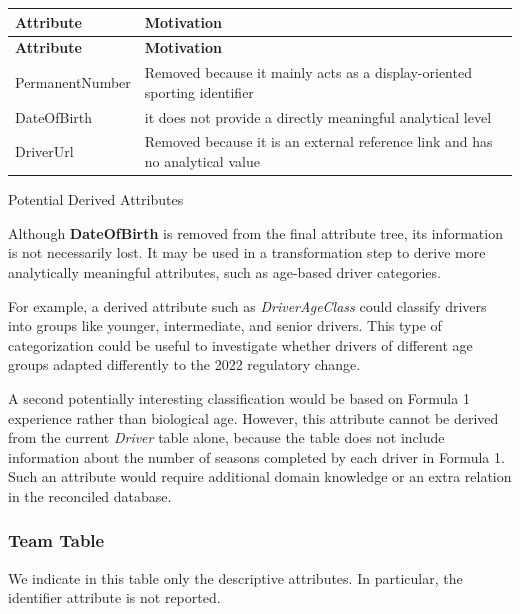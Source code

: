 \documentclass[a4paper,11pt]{article}
\begin{document}
	\begin{longtable}{|p{4.4cm}|p{10.8cm}|}
		\hline
		\textbf{Attribute} & \textbf{Motivation} \\
		\hline
		\endfirsthead
		
		\hline
		\textbf{Attribute} & \textbf{Motivation} \\
		\hline
		\endhead
		
		PermanentNumber & Removed because it mainly acts as a display-oriented sporting identifier  \\ \hline
		
		
		DateOfBirth & it does not provide a directly meaningful analytical level \\ \hline
		
		DriverUrl & Removed because it is an external reference link and has no analytical value \\ \hline
		
		
	\end{longtable}
	
	Potential Derived Attributes
	
	Although \textbf{DateOfBirth} is removed from the final attribute tree, its information is not necessarily lost. It may be used in a transformation step to derive more analytically meaningful attributes, such as age-based driver categories.
	
	For example, a derived attribute such as \textit{DriverAgeClass} could classify drivers into groups like younger, intermediate, and senior drivers. This type of categorization could be useful to investigate whether drivers of different age groups adapted differently to the 2022 regulatory change.
	
	A second potentially interesting classification would be based on Formula 1 experience rather than biological age. However, this attribute cannot be derived from the current \textit{Driver} table alone, because the table does not include information about the number of seasons completed by each driver in Formula 1. Such an attribute would require additional domain knowledge or an extra relation in the reconciled database.
	
	\subsubsection{Team Table}
	
	We indicate in this table only the descriptive attributes. In particular, the identifier attribute is not reported.
	
\end{document}
